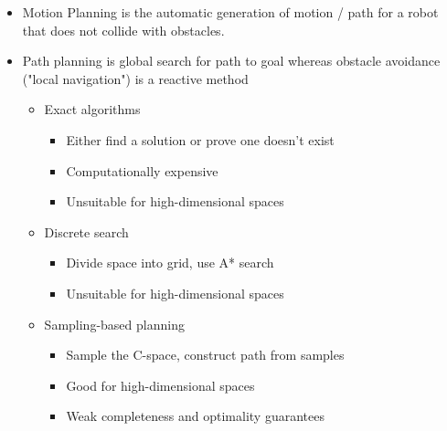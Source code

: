 \documentclass[../main.tex]{subfiles}
\begin{document}
    \begin{itemize}
        \item Motion Planning is the automatic generation of motion / path for a robot that does not collide with obstacles.
        \item Path planning is global search for path to goal whereas obstacle avoidance ("local navigation") is a reactive method
        \begin{itemize}
            \item Exact algorithms
            \begin{itemize}
                \item Either find a solution or prove one doesn't exist
                \item Computationally expensive
                \item Unsuitable for high-dimensional spaces
            \end{itemize}
            \item Discrete search
            \begin{itemize}
                \item Divide space into grid, use A* search
                \item Unsuitable for high-dimensional spaces
            \end{itemize}
            \item Sampling-based planning
            \begin{itemize}
                \item Sample the C-space, construct path from samples
                \item Good for high-dimensional spaces
                \item Weak completeness and optimality guarantees
            \end{itemize}
        \end{itemize}
    \end{itemize}
\end{document}
